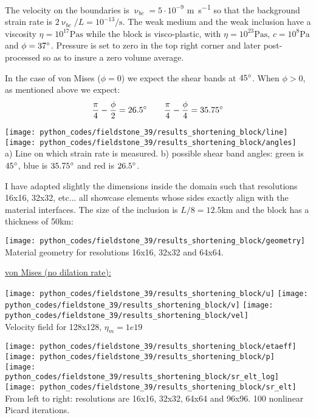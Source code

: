 The velocity on the boundaries is $\upnu_{bc}=5\cdot 10^{-9}$ \si{\metre\per\second} so that the background strain rate is 
$2 \upnu_{bc}/L = 10^{-13}\si{\per\second}$.
The weak medium and the weak inclusion have a viscosity $\eta=10^{17}\si{\pascal\second}$ while 
the block is visco-plastic, with $\eta=10^{23}\si{\pascal\second}$, $c=10^8\si{\pascal}$ 
and $\phi=37\degree$. 
Pressure is set to zero in the top right corner and later post-processed so as to insure a zero 
volume average.

In the case of von Mises ($\phi=0$) we expect the shear bands at $45\degree$. When $\phi>0$, as mentioned above
we expect:
\[
\frac{\pi}{4}-\frac{\phi}{2}=26.5\degree
\qquad
\frac{\pi}{4}-\frac{\phi}{4}=35.75\degree
\]

\begin{center}
\texttt{[image: python\_codes/fieldstone\_39/results\_shortening\_block/line]}
\texttt{[image: python\_codes/fieldstone\_39/results\_shortening\_block/angles]}\\
{\captionfont a) Line on which strain rate is measured. b) possible shear band angles:
green is $45\degree$, blue is $35.75\degree$ and red is $26.5\degree$.}
\end{center}


I have adapted slightly the dimensions inside the domain such that resolutions 16x16, 32x32, etc...
all showcase elements whose sides exactly align with the material interfaces. The size of the inclusion is 
$L/8=12.5$km and the block has a thickness of 50km:

\begin{center}
\texttt{[image: python\_codes/fieldstone\_39/results\_shortening\_block/geometry]}\\
{\captionfont Material geometry for resolutions 16x16, 32x32 and 64x64.}
\end{center}


\newpage
\underline{von Mises (no dilation rate):}

\begin{center}
\texttt{[image: python\_codes/fieldstone\_39/results\_shortening\_block/u]}
\texttt{[image: python\_codes/fieldstone\_39/results\_shortening\_block/v]}
\texttt{[image: python\_codes/fieldstone\_39/results\_shortening\_block/vel]}\\
{\captionfont Velocity field for 128x128, $\eta_m=1e19$}
\end{center}

\begin{center}
\texttt{[image: python\_codes/fieldstone\_39/results\_shortening\_block/etaeff]}
\texttt{[image: python\_codes/fieldstone\_39/results\_shortening\_block/p]}\\
\texttt{[image: python\_codes/fieldstone\_39/results\_shortening\_block/sr\_elt\_log]}
\texttt{[image: python\_codes/fieldstone\_39/results\_shortening\_block/sr\_elt]}\\
{\captionfont From left to right: resolutions are 16x16, 32x32, 64x64 and 96x96. 100 nonlinear Picard iterations.}
\end{center}


